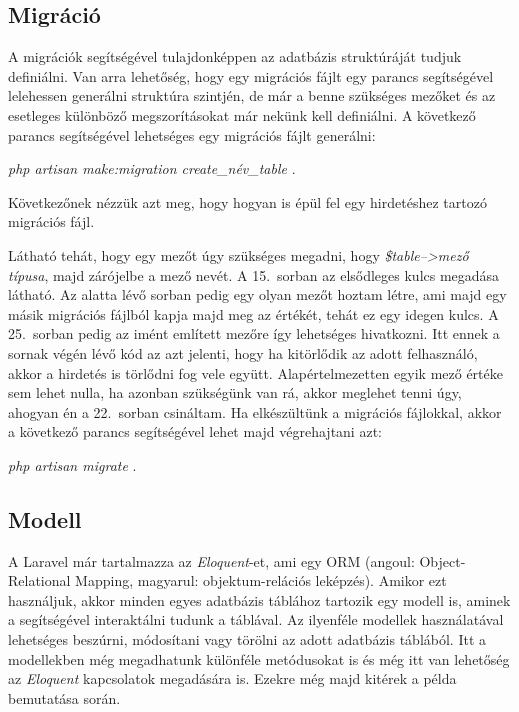 \documentclass[]{thesis-ekf}
\theoremstyle{definition}
\theoremstyle{remark}
\begin{document}
	\subsection{Migráció}
		A migrációk segítségével tulajdonképpen az adatbázis struktúráját tudjuk definiálni. Van arra lehetőség, hogy egy migrációs fájlt egy parancs segítségével lelehessen generálni struktúra szintjén, de már a benne szükséges mezőket és az esetleges különböző megszorításokat már nekünk kell definiálni. A következő parancs segítségével lehetséges egy migrációs fájlt generálni:
		\begin{center} 
			\emph{php artisan make:migration create\_név\_table} .
		\end{center}
		Következőnek nézzük azt meg, hogy hogyan is épül fel egy hirdetéshez tartozó migrációs fájl.
	
		
		
		Látható tehát, hogy egy mezőt úgy szükséges megadni, hogy \emph{\$table-->mező típusa}, majd zárójelbe a mező nevét. A 15.~sorban az elsődleges kulcs megadása látható. Az alatta lévő sorban pedig egy olyan mezőt hoztam létre, ami majd egy másik migrációs fájlból kapja majd meg az értékét, tehát ez egy idegen kulcs. A 25.~sorban pedig az imént említett mezőre így lehetséges hivatkozni. Itt ennek a sornak végén lévő kód az azt jelenti, hogy ha kitörlődik az adott felhasználó, akkor a hirdetés is törlődni fog vele együtt. Alapértelmezetten egyik mező értéke sem lehet nulla, ha azonban szükségünk van rá, akkor meglehet tenni úgy, ahogyan én a 22.~sorban csináltam. Ha elkészültünk a migrációs fájlokkal, akkor a következő parancs segítségével lehet majd végrehajtani azt:
		\begin{center}
			\emph{php artisan migrate} .
		\end{center}
	\subsection{Modell}
		A Laravel már tartalmazza az \emph{Eloquent}-et, ami egy ORM (angoul: Object-Relational Mapping, magyarul: objektum-relációs leképzés). Amikor ezt használjuk, akkor minden egyes adatbázis táblához tartozik egy modell is, aminek a segítségével interaktálni tudunk a táblával. Az ilyenféle modellek használatával lehetséges beszúrni, módosítani vagy törölni az adott adatbázis táblából. Itt a modellekben még megadhatunk különféle metódusokat is és még itt van lehetőség az \emph{Eloquent} kapcsolatok megadására is. Ezekre még majd kitérek a példa bemutatása során.\cite{Laravel}
		
\end{document}
